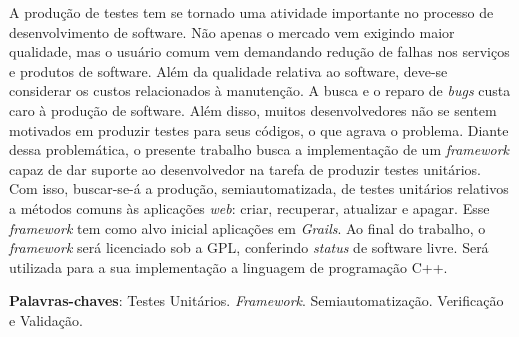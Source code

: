 \begin{resumo}
A produção de testes tem se tornado uma atividade importante no processo de desenvolvimento de software. Não apenas o mercado vem exigindo maior qualidade, mas o usuário comum vem demandando redução de falhas nos serviços e produtos de software. Além da qualidade relativa ao software, deve-se considerar os custos relacionados à manutenção. A busca e o reparo de \textit{bugs} custa caro à produção de software. Além disso, muitos desenvolvedores não se sentem motivados em produzir testes para seus códigos, o que agrava o problema. Diante dessa problemática, o presente trabalho busca a implementação de um \textit{framework} capaz de dar suporte ao desenvolvedor na tarefa de produzir testes unitários. Com isso, buscar-se-á a produção, semiautomatizada, de testes unitários relativos a métodos comuns às aplicações \textit{web}: criar, recuperar, atualizar e apagar. Esse \textit{framework} tem como alvo inicial aplicações em \textit{Grails}. Ao final do trabalho, o \textit{framework} será licenciado sob a GPL, conferindo \textit{status} de software livre. Será utilizada para a sua implementação a linguagem de programação C++.
\vspace{\onelineskip}
    
\noindent
\textbf{Palavras-chaves}: Testes Unitários. \textit{Framework}. Semiautomatização. Verificação e Validação.
\end{resumo}

